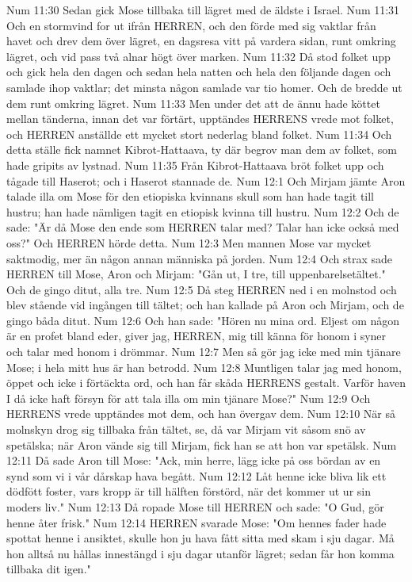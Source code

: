 Num 11:30  Sedan gick Mose tillbaka till lägret med de äldste i Israel.
Num 11:31  Och en stormvind for ut ifrån HERREN, och den förde med sig vaktlar från havet och drev dem över lägret, en dagsresa vitt på vardera sidan, runt omkring lägret, och vid pass två alnar högt över marken.
Num 11:32  Då stod folket upp och gick hela den dagen och sedan hela natten och hela den följande dagen och samlade ihop vaktlar; det minsta någon samlade var tio homer. Och de bredde ut dem runt omkring lägret.
Num 11:33  Men under det att de ännu hade köttet mellan tänderna, innan det var förtärt, upptändes HERRENS vrede mot folket, och HERREN anställde ett mycket stort nederlag bland folket.
Num 11:34  Och detta ställe fick namnet Kibrot-Hattaava, ty där begrov man dem av folket, som hade gripits av lystnad.
Num 11:35  Från Kibrot-Hattaava bröt folket upp och tågade till Haserot; och i Haserot stannade de.
Num 12:1  Och Mirjam jämte Aron talade illa om Mose för den etiopiska kvinnans skull som han hade tagit till hustru; han hade nämligen tagit en etiopisk kvinna till hustru.
Num 12:2  Och de sade: "Är då Mose den ende som HERREN talar med? Talar han icke också med oss?" Och HERREN hörde detta.
Num 12:3  Men mannen Mose var mycket saktmodig, mer än någon annan människa på jorden.
Num 12:4  Och strax sade HERREN till Mose, Aron och Mirjam: "Gån ut, I tre, till uppenbarelsetältet." Och de gingo ditut, alla tre.
Num 12:5  Då steg HERREN ned i en molnstod och blev stående vid ingången till tältet; och han kallade på Aron och Mirjam, och de gingo båda ditut.
Num 12:6  Och han sade: "Hören nu mina ord. Eljest om någon är en profet bland eder, giver jag, HERREN, mig till känna för honom i syner och talar med honom i drömmar.
Num 12:7  Men så gör jag icke med min tjänare Mose; i hela mitt hus är han betrodd.
Num 12:8  Muntligen talar jag med honom, öppet och icke i förtäckta ord, och han får skåda HERRENS gestalt. Varför haven I då icke haft försyn för att tala illa om min tjänare Mose?"
Num 12:9  Och HERRENS vrede upptändes mot dem, och han övergav dem.
Num 12:10  När så molnskyn drog sig tillbaka från tältet, se, då var Mirjam vit såsom snö av spetälska; när Aron vände sig till Mirjam, fick han se att hon var spetälsk.
Num 12:11  Då sade Aron till Mose: "Ack, min herre, lägg icke på oss bördan av en synd som vi i vår dårskap hava begått.
Num 12:12  Låt henne icke bliva lik ett dödfött foster, vars kropp är till hälften förstörd, när det kommer ut ur sin moders liv."
Num 12:13  Då ropade Mose till HERREN och sade: "O Gud, gör henne åter frisk."
Num 12:14  HERREN svarade Mose: "Om hennes fader hade spottat henne i ansiktet, skulle hon ju hava fått sitta med skam i sju dagar. Må hon alltså nu hållas innestängd i sju dagar utanför lägret; sedan får hon komma tillbaka dit igen."
